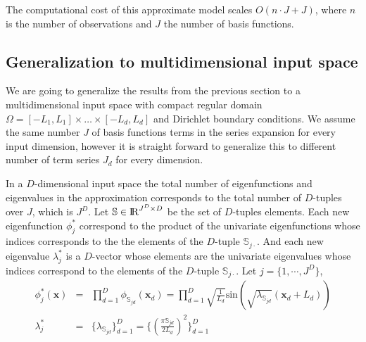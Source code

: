 \documentclass[]{interact}
\theoremstyle{plain}%
\theoremstyle{definition}
\theoremstyle{remark}
\begin{document}
The computational cost of this approximate model scales $O(n\cdot J+J)$, where $n$ is the number of observations and $J$ the number of basis functions.



\subsection{Generalization to multidimensional input space}

We are going to generalize the results from the previous section to a multidimensional input space with compact regular domain $\Omega=[-L_1,L_1] \times \dots \times [-L_d,L_d]$ and Dirichlet boundary conditions. We assume the same number $J$ of basis functions terms in the series expansion for every input dimension, however it is straight forward to generalize this to different number of term series $J_d$ for every dimension. 

\vspace{0.2cm}
In a $D$-dimensional input space the total number of eigenfunctions and eigenvalues in the approximation corresponds to the total number of $D$-tuples over $J$, which is $J^D$. Let $\mathbb{S}\in {\rm I\!R}^{J^D \times D}$ be the set of $D$-tuples elements. Each new eigenfunction $\phi^{\ast}_j$ correspond to the product of the univariate eigenfunctions whose indices corresponds to the the elements of the $D$-tuple $\mathbb{S}_{j\cdotp}$. And each new eigenvalue $\lambda^{\ast}_j$ is a $D$-vector whose elements are the univariate eigenvalues whose indices correspond to the elements of the $D$-tuple $\mathbb{S}_{j\cdotp}$. Let $j=\{1,\cdots,J^D\}$,
%
\begin{eqnarray}
\phi^{\ast}_j(\mathbf{x}) &=& \prod_{d=1}^{D} \phi_{\mathbb{S}_{jd}}(\mathbf{x}_d) = \prod_{d=1}^{D} \sqrt{\frac{1}{L_d}} \text{sin}\left(\sqrt{\lambda_{\mathbb{S}_{jd}}}(\mathbf{x}_d+L_d)\right)  \nonumber \\
%
\lambda^{\ast}_j &=& \{\lambda_{\mathbb{S}_{jd}} \}_{d=1}^D =  \{ \left(\tfrac{\pi \mathbb{S}_{jd}}{2L_d}\right)^2 \}_{d=1}^D  \nonumber
\end{eqnarray}
\end{document}

